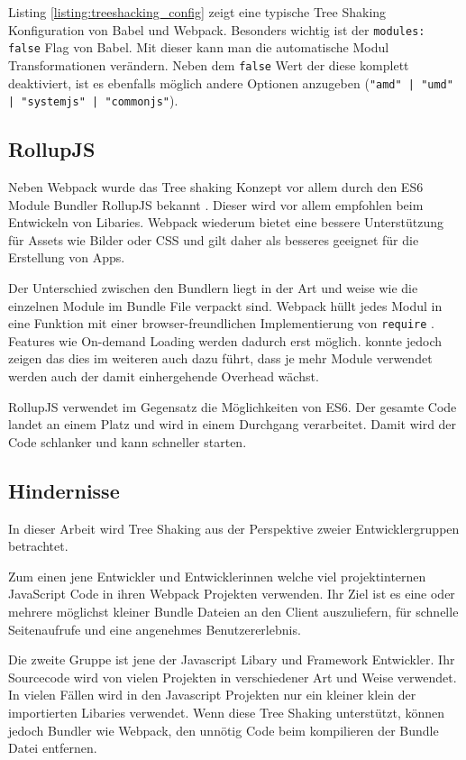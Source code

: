 Listing \ref{listing:treeshacking_config} zeigt eine typische Tree Shaking Konfiguration von Babel und Webpack. Besonders wichtig ist der \lstinline{modules: false} Flag von Babel. Mit dieser kann man die automatische Modul Transformationen verändern. Neben dem \lstinline{false} Wert der diese komplett deaktiviert, ist es ebenfalls möglich andere Optionen anzugeben (\lstinline{"amd" | "umd" | "systemjs" | "commonjs"}). \autocite{Babel}

\subsection{RollupJS}
Neben Webpack wurde das Tree shaking Konzept vor allem durch den ES6 Module Bundler RollupJS bekannt \autocite{WebpackTreeShaking}. Dieser wird vor allem empfohlen beim Entwickeln von Libaries. Webpack wiederum bietet eine bessere Unterstützung für Assets wie Bilder oder CSS und gilt daher als besseres geeignet für die Erstellung von Apps. \autocite{RichHarris}

Der Unterschied zwischen den Bundlern liegt in der Art und weise wie die einzelnen Module im Bundle File verpackt sind. Webpack hüllt jedes Modul in eine Funktion mit einer browser-freundlichen Implementierung von \lstinline{require} \autocite{RichHarris}. Features wie On-demand Loading werden dadurch erst möglich. \textcite{NolanLawson} konnte jedoch zeigen das dies im weiteren auch dazu führt, dass je mehr Module verwendet werden auch der damit einhergehende Overhead wächst.

RollupJS verwendet im Gegensatz die Möglichkeiten von ES6. Der gesamte Code landet an einem Platz und wird in einem Durchgang verarbeitet. Damit wird der Code schlanker und kann schneller starten. \autocite{RichHarris}

\subsection{Hindernisse}
\label{section:schwierigkeiten_beim_tree_shaking}
In dieser Arbeit wird Tree Shaking aus der Perspektive zweier Entwicklergruppen betrachtet. 

Zum einen jene Entwickler und Entwicklerinnen welche viel projektinternen JavaScript Code in ihren Webpack Projekten verwenden. Ihr Ziel ist es eine oder mehrere möglichst kleiner Bundle Dateien an den Client auszuliefern, für schnelle Seitenaufrufe und eine angenehmes Benutzererlebnis.

Die zweite Gruppe ist jene der Javascript Libary und Framework Entwickler. Ihr Sourcecode wird von vielen Projekten in verschiedener Art und Weise verwendet. In vielen Fällen wird in den Javascript Projekten nur ein kleiner klein der importierten Libaries verwendet. Wenn diese Tree Shaking unterstützt, können jedoch Bundler wie Webpack, den unnötig Code beim kompilieren der Bundle Datei entfernen.


